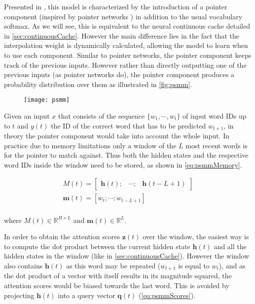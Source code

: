 Presented in \cite{merity2016pointer}, this model is characterized by the introduction of a pointer component (inspired by pointer networks \cite{vinyals2015pointer}) in addition to the usual vocabulary softmax. As we will see, this is equivalent to the neural continuous cache detailed in \autoref{sec:continuousCache}. However the main difference lies in the fact that the interpolation weight is dynamically calculated, allowing the model to learn when to use each component. Similar to pointer networks, the pointer component keeps track of the previous inputs. However rather than directly outputting one of the previous inputs (as pointer networks do), the pointer component produces a probability distribution over them as illustrated in \autoref{fig:psmm}.

\begin{figure}[H]
	\centering
	\texttt{[image: psmm]}
	\label{fig:psmm}
\end{figure}

Given an input $x$ that consists of the sequence $\{w_1, \cdots , w_t\}$ of input word IDs up to $t$ and $y(t)$ the ID of the correct word that has to be predicted $w_{t+1}$, in theory the pointer component would take into account the whole input. In practice due to memory limitations only a window of the $L$ most recent words is  for the pointer to match against. Thus both the hidden states and the respective word IDs inside the window need to be stored, as shown in \autoref{eq:psmmMemory}.

\begin{equation} \label{eq:psmmMemory}
	\begin{gathered}
		M(t) = \begin{bmatrix} \mathbf{h}(t); & \cdots; & \mathbf{h}(t-L+1) \end{bmatrix} \\
		\mathbf{m}(t) = [w_t; \cdots; w_{t-L+1}] \\
	\end{gathered}
\end{equation}

where $M(t) \in \mathbb{R}^{H \times L}$ and $\mathbf{m}(t) \in \mathbb{R}^{L}$. 

In order to obtain the attention scores $\mathbf{z}(t)$ over the window, the easiest way is to compute the dot product between the current hidden state $\mathbf{h}(t)$ and all the hidden states in the window (like in \autoref{sec:continuousCache}). However the window also contains $\mathbf{h}(t)$ as this word may be repeated ($w_{t+1}$ is equal to $w_t$), and as the dot product of a vector with itself results in its magnitude squared, the attention scores would be biased towards the last word. This is avoided by projecting $\mathbf{h}(t)$ into a query vector $\mathbf{q}(t)$ (\autoref{eq:psmmScores}).

